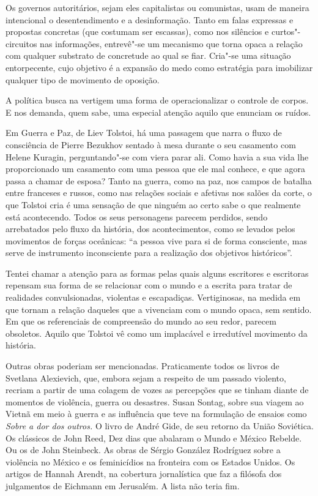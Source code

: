 Os governos autoritários, sejam eles capitalistas ou comunistas, usam de
maneira intencional o desentendimento e a desinformação. Tanto em falas
expressas e propostas concretas (que costumam ser escassas), como nos
silêncios e curtos"-circuitos nas informações, entrevê"-se um mecanismo
que torna opaca a relação com qualquer substrato de concretude ao qual
se fiar. Cria"-se uma situação entorpecente, cujo objetivo é a expansão
do medo como estratégia para imobilizar qualquer tipo de movimento de
oposição.

A política busca na vertigem uma forma de operacionalizar o controle de
corpos. E nos demanda, quem sabe, uma especial atenção aquilo que
enunciam os ruídos.

\asterisc

Em Guerra e Paz, de Liev Tolstoi, há uma passagem que narra o fluxo de
consciência de Pierre Bezukhov sentado à mesa durante o seu casamento
com Helene Kuragin, perguntando"-se com viera parar ali. Como havia a sua
vida lhe proporcionado um casamento com uma pessoa que ele mal conhece,
e que agora passa a chamar de esposa? Tanto na guerra, como na paz, nos
campos de batalha entre franceses e russos, como nas relações sociais e
afetivas nos salões da corte, o que Tolstoi cria é uma sensação de que
ninguém ao certo sabe o que realmente está acontecendo. Todos os seus
personagens parecem perdidos, sendo arrebatados pelo fluxo da história,
dos acontecimentos, como se levados pelos movimentos de forças
oceânicas: ``a pessoa vive para si de forma consciente, mas serve de
instrumento inconsciente para a realização dos objetivos históricos''.

Tentei chamar a atenção para as formas pelas quais alguns escritores e
escritoras repensam sua forma de se relacionar com o mundo e a escrita
para tratar de realidades convulsionadas, violentas e escapadiças.
Vertiginosas, na medida em que tornam a relação daqueles que a vivenciam
com o mundo opaca, sem sentido. Em que os referenciais de compreensão do
mundo ao seu redor, parecem obsoletos. Aquilo que Tolstoi vê como um
implacável e irredutível movimento da história.

Outras obras poderiam ser mencionadas. Praticamente todos os livros de
Svetlana Alexievich, que, embora sejam a respeito de um passado
violento, recriam a partir de uma colagem de vozes as percepções que se
tinham diante de momentos de violência, guerra ou desastres. Susan
Sontag, sobre sua viagem ao Vietnã em meio à guerra e as influência que
teve na formulação de ensaios como \emph{Sobre a dor dos outros.} O
livro de André Gide, de seu retorno da União Soviética. Os clássicos de
John Reed, Dez dias que abalaram o Mundo e México Rebelde. Ou os de John
Steinbeck. As obras de Sérgio González Rodríguez sobre a violência no
México e os feminicídios na fronteira com os Estados Unidos. Os artigos
de Hannah Arendt, na cobertura jornalística que faz a filósofa dos
julgamentos de Eichmann em Jerusalém. A lista não teria fim.

